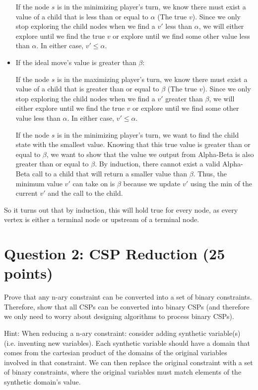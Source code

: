 \documentclass[11pt]{article}
\newcommand{\question}[1]{\section*{\normalsize #1}}
\begin{document}
\begin{itemize}
If the node $s$ is in the minimizing player's turn, we know there must exist a value of a child that is less than or equal to $\alpha$ (The true $v$). Since we only stop exploring the child nodes when we find a $v'$ less than $\alpha$, we will either explore until we find the true $v$ or explore until we find some other value less than $\alpha$. In either case, $v' \le \alpha$.

\item If the ideal move's value is greater than $\beta$:

If the node $s$ is in the maximizing player's turn, we know there must exist a value of a child that is greater than or equal to $\beta$ (The true $v$). Since we only stop exploring the child nodes when we find a $v'$ greater than $\beta$, we will either explore until we find the true $v$ or explore until we find some other value less than $\alpha$. In either case, $v' \le \alpha$.

If the node $s$ is in the minimizing player's turn, we want to find the child state with the smallest value. Knowing that this true value is greater than or equal to $\beta$, we want to show that the value we output from Alpha-Beta is also greater than or equal to $\beta$. By induction, there cannot exist a valid Alpha-Beta call to a child that will return a smaller value than $\beta$. Thus, the minimum value $v'$ can take on is $\beta$ because we update $v'$ using the min of the current $v'$ and the call to the child.
\end{itemize}

So it turns out that by induction, this will hold true for every node, as every vertex is either a terminal node or upstream of a terminal node.

\newpage

\question{Question 2: CSP Reduction (25 points)}
Prove that any n-ary constraint can be converted into a set of binary constraints. Therefore, show that all CSPs can be converted into binary CSPs (and therefore we only need to worry about designing algorithms to process binary CSPs).\newline\newline\newline

\noindent Hint: When reducing a n-ary constraint: consider adding synthetic variable(s) (i.e. inventing new variables). Each synthetic variable should have a domain that comes from the cartesian product of the domains of the original variables involved in that constraint. We can then replace the original constraint with a set of binary constraints, where the original variables must match elements of the synthetic domain's value.
\newpage
\end{document}

